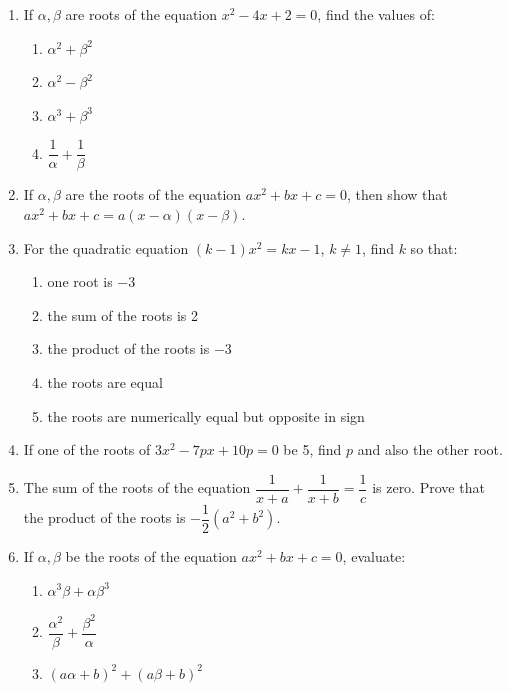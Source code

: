 \documentclass[12pt,a4paper]{article}
\begin{document}
\begin{enumerate}[label=Example \arabic*.]
    \item If \( \alpha, \beta \) are roots of the equation \( x^2 - 4x + 2 = 0 \), find the values of:
    \begin{enumerate}[label=(\roman*)]
        \item \( \alpha^2 + \beta^2 \)
        \item \( \alpha^2 - \beta^2 \)
        \item \( \alpha^3 + \beta^3 \)
        \item \( \dfrac{1}{\alpha} + \dfrac{1}{\beta} \)
    \end{enumerate}

    \item If \( \alpha, \beta \) are the roots of the equation \( ax^2 + bx + c = 0 \), then show that \( ax^2 + bx + c = a(x - \alpha)(x - \beta) \).

    \item For the quadratic equation \( (k-1)x^2 = kx - 1 \), \( k \neq 1 \), find \( k \) so that:
    \begin{enumerate}[label=(\roman*)]
        \item one root is \( -3 \)
        \item the sum of the roots is 2
        \item the product of the roots is \( -3 \)
        \item the roots are equal
        \item the roots are numerically equal but opposite in sign
    \end{enumerate}

    \item If one of the roots of \( 3x^2 - 7px + 10p = 0 \) be 5, find \( p \) and also the other root.

    \item The sum of the roots of the equation \( \dfrac{1}{x+a} + \dfrac{1}{x+b} = \dfrac{1}{c} \) is zero. Prove that the product of the roots is \( -\dfrac{1}{2}(a^2 + b^2) \).

    \item If \( \alpha, \beta \) be the roots of the equation \( ax^2 + bx + c = 0 \), evaluate:
    \begin{enumerate}[label=(\roman*)]
        \item \( \alpha^3\beta + \alpha\beta^3 \)
        \item \( \dfrac{\alpha^2}{\beta} + \dfrac{\beta^2}{\alpha} \)
        \item \( (a\alpha + b)^2 + (a\beta + b)^2 \)
    \end{enumerate}
\end{enumerate}
\end{document}
